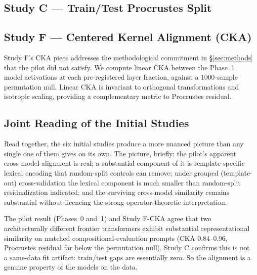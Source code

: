 





\subsection{Study C — Train/Test Procrustes Split}
\label{sec:results-study-c}



\subsection{Study F — Centered Kernel Alignment (CKA)}
\label{sec:results-study-f-cka}

Study F's CKA piece addresses the methodological commitment in
\S\ref{sec:methods} that the pilot did not satisfy. We compute linear
CKA \cite{kornblith2019similarity} between the Phase~1 model
activations at each pre-registered layer fraction, against a $1000$-sample
permutation null. Linear CKA is invariant to orthogonal transformations
and isotropic scaling, providing a complementary metric to Procrustes
residual.



\subsection{Joint Reading of the Initial Studies}
\label{sec:joint-reading}

Read together, the six initial studies produce a more nuanced picture
than any single one of them gives on its own. The picture, briefly:
the pilot's apparent cross-model alignment is real; a substantial
component of it is template-specific lexical encoding that random-split
controls can remove; under grouped (template-out) cross-validation
the lexical component is much smaller than random-split residualization
indicated; and the surviving cross-model similarity remains
substantial without licencing the strong operator-theoretic
interpretation.

The pilot result (Phases~0 and~1) and Study F-CKA agree that two
architecturally different frontier transformers exhibit substantial
representational similarity on matched compositional-evaluation
prompts (CKA $0.84$--$0.96$, Procrustes residual far below the
permutation null). Study C confirms this is not a same-data fit
artifact: train/test gaps are essentially zero. So the alignment is a
genuine property of the models on the data.

